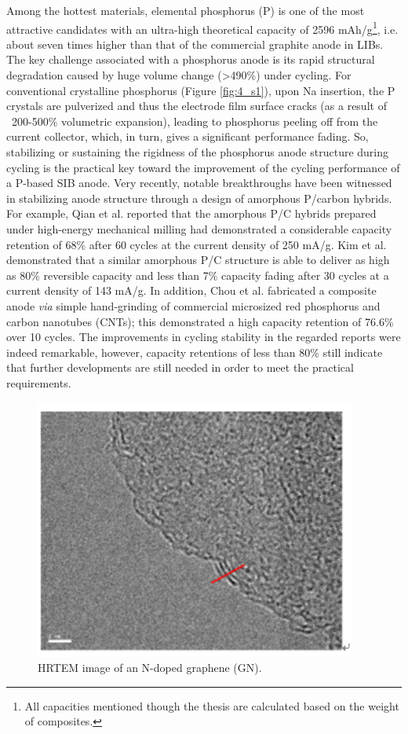 Among the hottest materials, elemental phosphorus (P) is one of the most attractive candidates with an ultra-high theoretical capacity of 2596 mAh/g\footnote{All capacities mentioned though the thesis are calculated based on the weight of composites.},\cite{Qian2013b,Kim2013c,Li2013c} i.e. about seven times higher than that of the commercial graphite anode in LIBs. The key challenge associated with a phosphorus anode is its rapid structural degradation caused by huge volume change (>490\%) under cycling. For conventional crystalline phosphorus (Figure \ref{fig:4_s1}), upon Na insertion, the P crystals are pulverized and thus the electrode film surface cracks (as a result of ~200-500\% volumetric expansion), leading to phosphorus peeling off from the current collector, which, in turn, gives a significant performance fading. So, stabilizing or sustaining the rigidness of the phosphorus anode structure during cycling is the practical key toward the improvement of the cycling performance of a P-based SIB anode. Very recently, notable breakthroughs have been witnessed in stabilizing anode structure through a design of amorphous P/carbon hybrids.\cite{Qian2013b,Kim2013c,Li2013c} For example, Qian et al. reported that the amorphous P/C hybrids prepared under high-energy mechanical milling had demonstrated a considerable capacity retention of 68\% after 60 cycles at the current density of 250 mA/g.\cite{Qian2013b} Kim et al. demonstrated that a similar amorphous P/C structure is able to deliver as high as 80\% reversible capacity and less than 7\% capacity fading after 30 cycles at a current density of 143 mA/g.\cite{Kim2013c} In addition, Chou et al. fabricated a composite anode \textit{via} simple hand-grinding of commercial microsized red phosphorus and carbon nanotubes (CNTs); this demonstrated a high capacity retention of 76.6\% over 10 cycles.\cite{Li2013c} The improvements in cycling stability in the regarded reports were indeed remarkable, however, capacity retentions of less than 80\% still indicate that further developments are still needed in order to meet the practical requirements.\cite{Luo2015b}\\

\begin{figure}  
\centering
\includegraphics[width=300pt]{figures/figure4_s2}
\caption[TEM of GN]
{HRTEM image of an N-doped graphene (GN).
\label{fig:4_s2}}
\end{figure}

